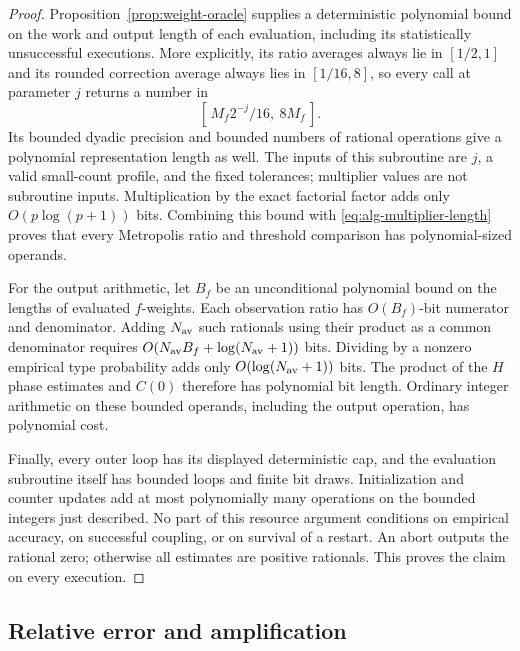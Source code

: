 \begin{proof}
Proposition~\ref{prop:weight-oracle} supplies a deterministic
polynomial bound on the work and output length of each evaluation,
including its statistically unsuccessful executions.  More
explicitly, its ratio averages always lie in \([1/2,1]\) and its
rounded correction average always lies in \([1/16,8]\), so every
call at parameter \(j\) returns a number in
\[
 [\,M_f2^{-j}/16,\ 8M_f\,].
\]
Its bounded dyadic precision and bounded numbers of rational
operations give a polynomial representation length as well.
The inputs of this subroutine are \(j\), a valid small-count
profile, and the fixed tolerances; multiplier values are not
subroutine inputs.  Multiplication by the exact factorial factor
adds only \(O(p\log(p+1))\) bits.  Combining this bound with
\eqref{eq:alg-multiplier-length} proves that every Metropolis
ratio and threshold comparison has polynomial-sized operands.

For the output arithmetic, let \(B_f\) be an unconditional
polynomial bound on the lengths of evaluated \(f\)-weights.
Each observation ratio has \(O(B_f)\)-bit numerator and
denominator.  Adding \(N_{\rm av}\) such rationals using their
product as a common denominator requires
\(O(N_{\rm av}B_f+\log(N_{\rm av}+1))\) bits.  Dividing by
a nonzero empirical type probability adds only
\(O(\log(N_{\rm av}+1))\) bits.  The product of the \(H\)
phase estimates and \(C(0)\) therefore has polynomial bit
length.  Ordinary integer arithmetic on these bounded operands,
including the output operation, has polynomial cost.

Finally, every outer loop has its displayed deterministic cap,
and the evaluation subroutine itself has bounded loops and finite
bit draws.  Initialization and counter updates add at most
polynomially many operations on the bounded integers just described.
No part of this resource argument conditions on empirical accuracy,
on successful coupling, or on survival of a restart.  An abort
outputs the rational zero; otherwise all estimates are positive
rationals.  This proves the claim on every execution.
\end{proof}

\subsection{Relative error and amplification}

